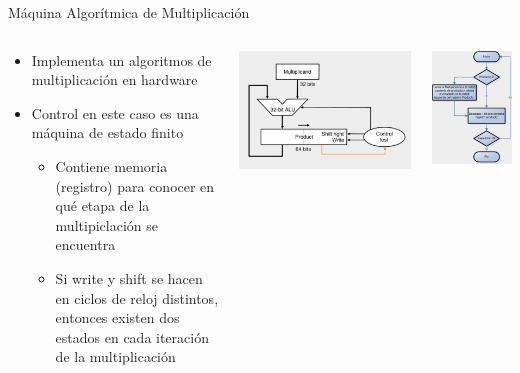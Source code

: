 \documentclass[aspectratio=169,compress]{beamer}
\begin{document}
\begin{footnotesize}
\begin{frame}{Máquina Algorítmica de Multiplicación}
\begin{columns}[onlytextwidth,T]
\begin{footnotesize}
\begin{itemize}
\item Implementa un algoritmos de multiplicación en hardware
\item Control en este caso es una máquina de estado finito
\begin{footnotesize}
\begin{itemize}
\item Contiene memoria (registro) para conocer en qué etapa de la multipiclación se encuentra
\bigskip
\item Si write y shift se hacen en ciclos de reloj distintos, entonces existen dos estados en cada iteración de la multiplicación
\end{itemize}
\end{footnotesize}
\bigskip
\end{itemize}
\end{footnotesize}

       \column{60mm}
\includegraphics[scale=0.25]{images/maq-alg-mult.jpg} 

\includegraphics[scale=0.25]{images/alg.jpg} 
    \end{columns}
\end{frame}




\end{footnotesize}
\end{document}
